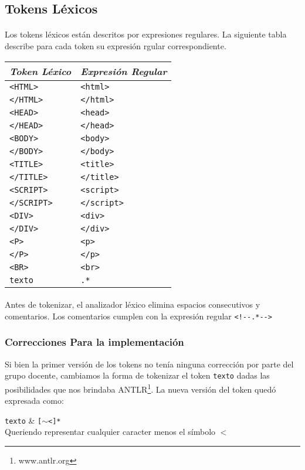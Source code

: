 \subsection{Tokens L\'exicos}

\paragraph{} Los tokens l\'exicos est\'an descritos por expresiones regulares. La siguiente tabla describe para cada token su expresi\'on rgular correspondiente.


\begin{center}
    
\begin{tabular}{|l|l|}
\hline
\emph{Token L\'exico} & \emph{Expresi\'on Regular}\\
\hline \hline
\verb|<HTML>| & \texttt{<html>} \\
\verb|</HTML>| & \texttt{</html>}\\
\verb|<HEAD>| & \texttt{<head>}\\
\verb|</HEAD>| & \texttt{</head>}\\
\verb|<BODY>| & \texttt{<body>}\\
\verb|</BODY>| & \texttt{</body>}\\
\verb|<TITLE>| & \texttt{<title>}\\
\verb|</TITLE>| & \texttt{</title>}\\
\verb|<SCRIPT>| & \texttt{<script>}\\
\verb|</SCRIPT>| & \texttt{</script>}\\
\verb|<DIV>| & \texttt{<div>}\\
\verb|</DIV>| & \texttt{</div>}\\
\verb|<P>| & \texttt{<p>}\\
\verb|</P>| & \texttt{</p>}\\
\verb|<BR>| & \texttt{<br>}\\
\verb|texto| & \texttt{.*}\\
\hline
\end{tabular}

\end{center}
\paragraph{} Antes de tokenizar, el analizador l\'exico elimina espacios consecutivos y comentarios.
Los comentarios cumplen con la expresi\'on regular \verb|<!--.*-->|

\subsubsection{Correcciones Para la implementaci\'on}
Si bien la primer versi\'on de los tokens no ten\'ia ninguna corrección por parte del grupo docente, cambiamos la forma de tokenizar el token \verb|texto| dadas las posibilidades que nos brindaba ANTLR\footnote{www.antlr.org}. La nueva versi\'on del token qued\'o expresada como:

\verb|texto| & \texttt{[$\sim$<]*}\\
Queriendo representar cualquier caracter menos el s\'imbolo $<$


